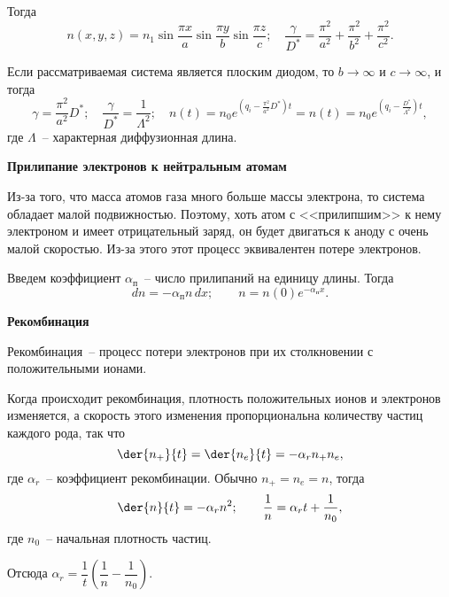 Тогда
\[
  n(x, y, z) = n_1\sin\frac{\pi x}{a} \sin\frac{\pi y}{b} \sin\frac{\pi z}{c};
    \quad \frac{\gamma}{D^*} = \frac{\pi^2}{a^2} + \frac{\pi^2}{b^2} +
    \frac{\pi^2}{c^2}.
\]

Если рассматриваемая система является плоским диодом, то \( b\to\infty \) и
\( c\to\infty \), и тогда
\[
  \gamma = \frac{\pi^2}{a^2}D^*; \quad
    \frac{\gamma}{D^*} = \frac{1}{\Lambda^2}; \quad
    n(t) = n_0 e^{\left( q_i - \frac{\pi^2}{a^2}D^* \right)t} =
    n(t) = n_0 e^{\left( q_i - \frac{D^*}{\Lambda^2} \right)t},
\]
где \( \Lambda \)~-- характерная диффузионная длина.

\textbf{Прилипание электронов к нейтральным атомам}

Из-за того, что масса атомов газа много больше массы электрона, то система
обладает малой подвижностью. Поэтому, хоть атом с <<прилипшим>> к нему
электроном и имеет отрицательный заряд, он будет двигаться к аноду с очень малой
скоростью. Из-за этого этот процесс эквивалентен потере электронов.

Введем коэффициент \( \alpha_\text{п} \)~-- число прилипаний на единицу длины.
Тогда
\[
  dn = -\alpha_\text{п}n\,dx; \qquad n = n(0)e^{-\alpha_\text{п}x}.
\]

\textbf{Рекомбинация}

Рекомбинация~-- процесс потери электронов при их столкновении с положительными
ионами.

Когда происходит рекомбинация, плотность положительных ионов и электронов
изменяется, а скорость этого изменения пропорциональна количеству частиц каждого
рода, так что
\[
  \der{n_+}{t} = \der{n_e}{t} = -\alpha_r n_+ n_e,
\]
где \( \alpha_r \)~-- коэффициент рекомбинации. Обычно \( n_+ = n_e = n \),
тогда
\[
  \der{n}{t} = -\alpha_r n^2; \qquad
    \frac{1}{n} = \alpha_r t + \frac{1}{n_0},
\]
где \( n_0 \)~-- начальная плотность частиц.

Отсюда
\(
  \alpha_r = \dfrac{1}{t} \left( \dfrac{1}{n} - \dfrac{1}{n_0} \right)
\).
